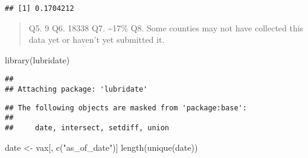 \documentclass[
]{article}
\newenvironment{Shaded}{\begin{snugshade}}{\end{snugshade}}
\newcommand{\FunctionTok}[1]{\textcolor[rgb]{0.00,0.00,0.00}{#1}}
\newcommand{\NormalTok}[1]{#1}
\newcommand{\OtherTok}[1]{\textcolor[rgb]{0.56,0.35,0.01}{#1}}
\newcommand{\SpecialCharTok}[1]{\textcolor[rgb]{0.00,0.00,0.00}{#1}}
\newcommand{\StringTok}[1]{\textcolor[rgb]{0.31,0.60,0.02}{#1}}
\begin{document}
\begin{Shaded}
\end{Shaded}

\begin{verbatim}
## [1] 0.1704212
\end{verbatim}

\begin{quote}
Q5. 9 Q6. 18338 Q7. \textasciitilde17\% Q8. Some counties may not have
collected this data yet or haven't yet submitted it.
\end{quote}

\begin{Shaded}
\begin{Highlighting}[]
\FunctionTok{library}\NormalTok{(lubridate)}
\end{Highlighting}
\end{Shaded}

\begin{verbatim}
## 
## Attaching package: 'lubridate'
\end{verbatim}

\begin{verbatim}
## The following objects are masked from 'package:base':
## 
##     date, intersect, setdiff, union
\end{verbatim}

\begin{Shaded}
\end{Shaded}

\begin{Shaded}
\begin{Highlighting}[]
\NormalTok{date }\OtherTok{\textless{}{-}}\NormalTok{ vax[, }\FunctionTok{c}\NormalTok{(}\StringTok{"as\_of\_date"}\NormalTok{)]}
\FunctionTok{length}\NormalTok{(}\FunctionTok{unique}\NormalTok{(date))}
\end{Highlighting}
\end{Shaded}
\end{document}
